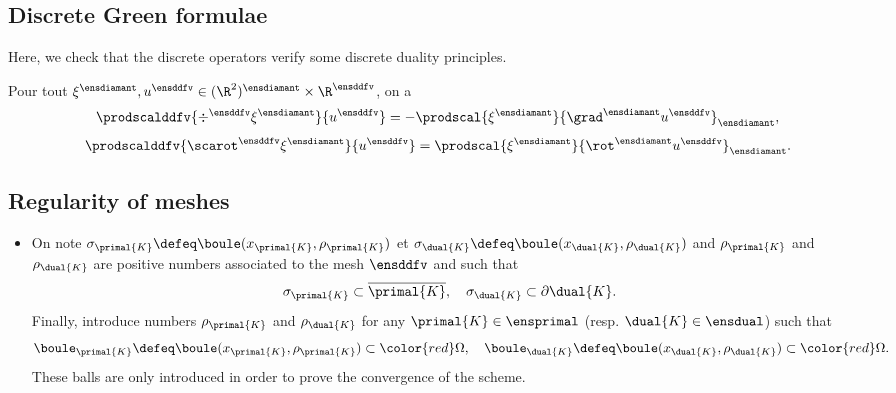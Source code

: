 \subsection{Discrete Green formulae}

Here, we check that the discrete operators verify some discrete duality principles.

\begin{theo}
Pour tout $\xi^\ensdiamant, u^\ensddfv \in (\R^2)^\ensdiamant \times \R^\ensddfv$, on a
\[
\prodscalddfv{\div^\ensddfv \xi^\ensdiamant}{u^\ensddfv} = - \prodscal{\xi^\ensdiamant}{\grad^\ensdiamant u^\ensddfv}_\ensdiamant,
\]
\[
\prodscalddfv{\scarot^\ensddfv \xi^\ensdiamant}{u^\ensddfv} = \prodscal{\xi^\ensdiamant}{\rot^\ensdiamant u^\ensddfv}_\ensdiamant.
\]
\end{theo}
\begin{demo}
    
\end{demo}

\begin{figure}[H]
\centering
\begin{subfigure}[t]{.5\textwidth}
    \centering
    
    \caption{}
\end{subfigure}%
\begin{subfigure}[t]{.5\textwidth}
    \centering
    
    \caption{}
\end{subfigure}
\caption{}
\end{figure}

\subsection{Regularity of meshes}

\begin{itemize}

    \item On note $\sigma_{\primal{K}} \defeq \boule(x_{\primal{K}}, \rho_{\primal{K}})$ et $\sigma_{\dual{K}} \defeq \boule(x_{\dual{K}}, \rho_{\dual{K}})$ and $\rho_{\primal{K}}$ and $\rho_{\dual{K}}$ are positive numbers associated to the mesh $\ensddfv$ and such that
    \[
    \sigma_{\primal{K}} \subset \overline{\primal{K}}, \quad \sigma_{\dual{K}} \subset \partial \dual{K}.
    \]
    Finally, introduce numbers $\rho_{\primal{K}}$ and $\rho_{\dual{K}}$ for any $\primal{K} \in \ensprimal$ (resp. $\dual{K} \in \ensdual$) such that
    \[
    \boule_{\primal{K}} \defeq \boule(x_{\primal{K}}, \rho_{\primal{K}}) \subset {\color{red}\Omega}, \quad
    \boule_{\dual{K}} \defeq \boule(x_{\dual{K}}, \rho_{\dual{K}}) \subset {\color{red}\Omega}.
    \]
    These balls are only introduced in order to prove the convergence of the scheme. 
\end{itemize}

